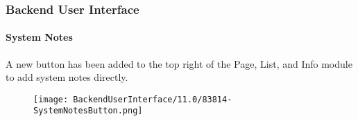 %

\begin{frame}[fragile]
	\frametitle{Backend User Interface}
	\framesubtitle{System Notes}

	A new button has been added to the top right of the Page, List, and Info module
	to add system notes directly.

	\begin{figure}
		\texttt{[image: BackendUserInterface/11.0/83814-SystemNotesButton.png]}
	\end{figure}

\end{frame}

